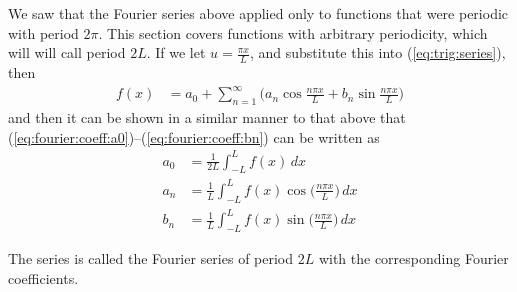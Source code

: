 We saw that the Fourier series above applied only to functions that were periodic with period $2\pi$.  This section covers functions with arbitrary periodicity, which will will call period $2L$.   If we let  $u=\frac{\pi x}{L}$, and substitute this into (\ref{eq:trig:series}), then 
% 
\begin{align}
f(x) & = a_0 + \sum_{n=1}^{\infty} \biggl( a_n \cos \frac{n\pi x}{L} + b_n \sin \frac{n \pi x}{L} \biggr)  \label{eq:FS:period:2L}
\end{align}
and then it can be shown in a similar manner to that above that (\ref{eq:fourier:coeff:a0})--(\ref{eq:fourier:coeff:bn}) can be written as
%
\begin{align}
a_0 & = \frac{1}{2L} \int_{-L}^L f(x) \, dx \label{eq:coeff:period:2L:a0} \\
a_n & = \frac{1}{L} \int_{-L}^{L} f(x) \cos \biggl( \frac{n\pi x}{L} \biggr) \, dx 
\label{eq:coeff:period:2L:an}\\
b_n & =  \frac{1}{L} \int_{-L}^{L} f(x) \sin \biggl( \frac{n\pi x}{L} \biggr) \, dx
\label{eq:coeff:period:2L:bn}
\end{align}

The series is called the Fourier series of period $2L$ with the corresponding Fourier coefficients.  


